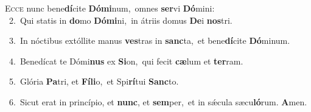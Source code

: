 \lettrine{\initial\textcolor{\initialcolor}{E}}{cce} nunc bene\-\textbf{dí}\-cite \textbf{Dó}\-\textbf{mi}num,~\star omnes \textbf{ser}\-vi \textbf{Dó}\-mini:\\
{\numbfont\textcolor{\numbcolor}{~2.}}~Qui statis in \textbf{do}\-mo \textbf{Dó}\-\textbf{mi}ni,~\star in átriis domus \textbf{De}\-i \textbf{nos}\-tri.\par
{\numbfont\textcolor{\numbcolor}{~3.}}~In nóctibus extóllite manus \textbf{ves}\-tras in \textbf{sanc}\-ta,~\star et bene\-\textbf{dí}\-cite \textbf{Dó}\-minum.\par
{\numbfont\textcolor{\numbcolor}{~4.}}~Benedícat te Dómi\textbf{nus} ex \textbf{Si}\-on,~\star qui fecit \textbf{cæ}\-lum et \textbf{ter}\-ram.\par
{\numbfont\textcolor{\numbcolor}{~5.}}~Glória \textbf{Pa}\-tri, et \textbf{Fí}\-\textbf{li}o,~\star et Spi\-\textbf{rí}\-tui \textbf{Sanc}\-to.\par
{\numbfont\textcolor{\numbcolor}{~6.}}~Sicut erat in princípio, et \textbf{nunc}\-, et \textbf{sem}\-per,~\star et in sǽcula sæcu\-\textbf{ló}\-rum. \textbf{A}\-men.\par
